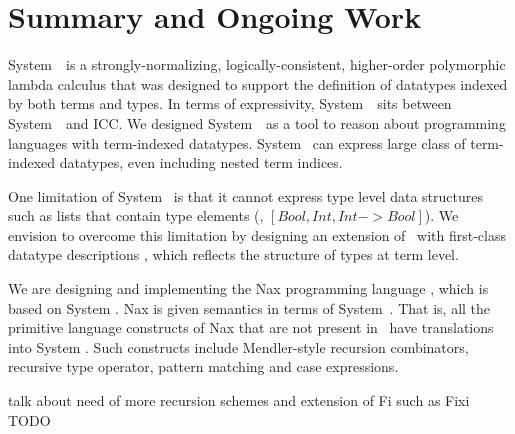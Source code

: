 \section{Summary and Ongoing Work} \label{sec:concl}
System~\Fi\ is a strongly-normalizing, logically-consistent, higher-order
polymorphic lambda calculus that was designed to support the
definition of datatypes indexed by both terms and types.
In terms of expressivity, System~\Fi\ sits between System~\Fw\ and ICC.
We designed System~\Fi\ as a tool to reason about programming
languages with term-indexed datatypes. System \Fi\ can express
large class of term-indexed datatypes, even including nested term
indices.

One limitation of System \Fi\ is that it cannot express type level
data structures such as lists that contain type elements (\eg,
$[\textit{Bool}, \textit{Int}, \textit{Int} -> \textit{Bool}]$).
We envision to overcome this limitation by designing an extension of \Fi\
with first-class datatype descriptions \cite{DagMcb12}, which reflects
the structure of types at term level.

We are designing and implementing the Nax programming language
\cite{TODO cite Nax}, which is based on System \Fi.
Nax is given semantics in terms of System~\Fi.
That is, all the primitive language constructs of Nax
that are not present in \Fi\ have translations into System \Fi.
Such constructs include Mendler-style recursion combinators,
recursive type operator, pattern matching and case expressions.

talk about need of more recursion schemes and extension of Fi such as Fixi
TODO

